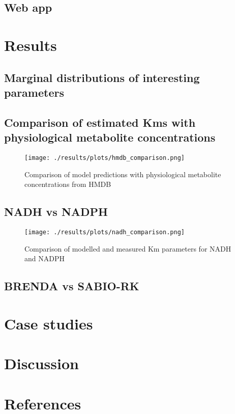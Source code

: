 \documentclass[11pt]{article}
\begin{document}
\subsection{Web app}
\label{sec:orge6374d2}
\section{Results}
\label{sec:org21ac059}
\subsection{Marginal distributions of interesting parameters}
\label{sec:org8bc318e}
\subsection{Comparison of estimated Kms with physiological metabolite concentrations}
\label{sec:orgbc6eea3}
\begin{figure}[htbp]
\centering
\texttt{[image: ./results/plots/hmdb\_comparison.png]}
\caption{\label{fig:org83a902f}Comparison of model predictions with physiological metabolite concentrations from HMDB}
\end{figure}

\subsection{NADH vs NADPH}
\label{sec:org1fdc6c3}


\begin{figure}[htbp]
\centering
\texttt{[image: ./results/plots/nadh\_comparison.png]}
\caption{\label{fig:org3ae5622}Comparison of modelled and measured Km parameters for NADH and NADPH}
\end{figure}

\subsection{BRENDA vs SABIO-RK}
\label{sec:org5f86a62}

\section{Case studies}
\label{sec:orgd3eb7c0}
\section{Discussion}
\label{sec:org599ba7b}
\section{References}
\label{sec:orgf7f9da0}
\end{document}
